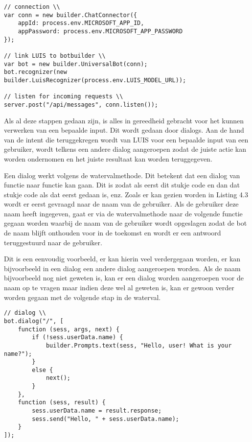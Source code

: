 \medskip
\begin{lstlisting}[caption=Connectie en linken van LUIS]
// connection \\
var conn = new builder.ChatConnector({
	appId: process.env.MICROSOFT_APP_ID,
	appPassword: process.env.MICROSOFT_APP_PASSWORD
});

// link LUIS to botbuilder \\
var bot = new builder.UniversalBot(conn);
bot.recognizer(new builder.LuisRecognizer(process.env.LUIS_MODEL_URL));

// listen for incoming requests \\
server.post("/api/messages", conn.listen());
\end{lstlisting}

Als al deze stappen gedaan zijn, is alles in gereedheid gebracht voor het kunnen verwerken van een bepaalde input. Dit wordt gedaan door dialogs. Aan de hand van de intent die teruggekregen wordt van LUIS voor een bepaalde input van een gebruiker, wordt telkens een andere dialog aangeroepen zodat de juiste actie kan worden ondernomen en het juiste resultaat kan worden teruggegeven.

Een dialog werkt volgens de watervalmethode. Dit betekent dat een dialog van functie naar functie kan gaan. Dit is zodat als eerst dit stukje code en dan dat stukje code als dat eerst gedaan is, enz. Zoals er kan gezien worden in Listing 4.3 wordt er eerst gevraagd naar de naam van de gebruiker. Als de gebruiker deze naam heeft ingegeven, gaat er via de watervalmethode naar de volgende functie gegaan worden waarbij de naam van de gebruiker wordt opgeslagen zodat de bot de naam blijft onthouden voor in de toekomst en wordt er een antwoord teruggestuurd naar de gebruiker.

Dit is een eenvoudig voorbeeld, er kan hierin veel verdergegaan worden, er kan bijvoorbeeld in een dialog een andere dialog aangeroepen worden. Als de naam bijvoorbeeld nog niet geweten is, kan er een dialog worden aangeroepen voor de naam op te vragen maar indien deze wel al geweten is, kan er gewoon verder worden gegaan met de volgende stap in de waterval.

\medskip
\begin{lstlisting}[caption=Watervalmethode]
// dialog \\
bot.dialog("/", [
	function (sess, args, next) {
		if (!sess.userData.name) {
			builder.Prompts.text(sess, "Hello, user! What is your name?");
		}
		else {
			next();
		}
	},
	function (sess, result) {
		sess.userData.name = result.response;
		sess.send("Hello, " + sess.userData.name);
	}
]);
\end{lstlisting}

